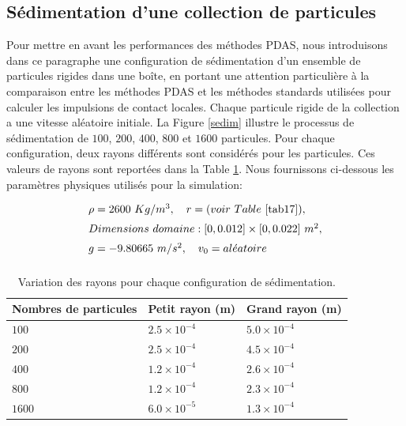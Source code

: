\subsection{Sédimentation d'une collection de particules}\label{ex3}

Pour mettre en avant les performances des méthodes PDAS, nous introduisons dans ce paragraphe une configuration de sédimentation d'un ensemble de particules rigides dans une boîte, en portant une attention particulière à la comparaison entre les méthodes PDAS et les méthodes standards utilisées pour calculer les impulsions de contact locales. Chaque particule rigide de la collection a une vitesse aléatoire initiale. La Figure \ref{sedim} illustre le processus de sédimentation de $100 $, $200 $, $400 $, $800 $ et $1600 $ particules. Pour chaque configuration, deux rayons différents sont considérés pour les particules. Ces valeurs de rayons sont reportées dans la Table \ref{tab17}. Nous fournissons ci-dessous les paramètres physiques utilisés pour la simulation:

\begin{eqnarray*}
	\begin{array}{l}
	    \rho=2600\ Kg/m^3, \quad r = (voir\ Table\ \ref{tab17}) ,\nonumber\\[2mm]
		Dimensions\ domaine: [0,0.012] \times [0,0.022]\ m^2,\nonumber\\[2mm] 
		g = -9.80665\ m/s^2, \quad v_0 = al\acute{e}atoire \nonumber\\[2mm]
	\end{array}
\end{eqnarray*}

\begin{center}
\begin{table}[!h]
\begin{tabular}{ |p{4cm}|p{4cm}|p{4cm}| }

 \hline \rowcolor{lightgray}
 Nombres de particules& Petit rayon (m)& Grand rayon (m)\\
 \hline
 $100$ & $2.5\times10^{-4}$& $5.0\times10^{-4}$\\
 $200$ & $2.5\times10^{-4}$& $4.5\times10^{-4}$\\
 $400$ & $1.2\times10^{-4}$& $2.6\times10^{-4}$\\
 $800$ & $1.2\times10^{-4}$& $2.3\times10^{-4}$\\
 $1600$ & $6.0\times10^{-5}$& $1.3\times10^{-4}$\\
 \hline
\end{tabular}
\caption{Variation des rayons pour chaque configuration de sédimentation.}\label{tab17}
\end{table}
\end{center}


